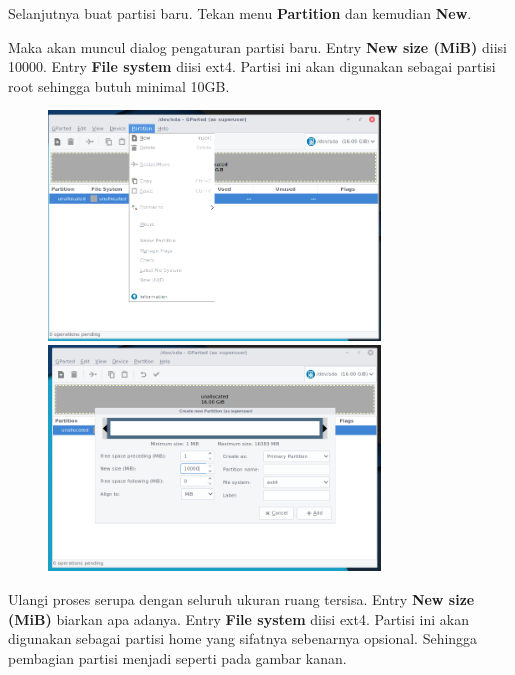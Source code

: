 \documentclass[12pt,]{article}
\begin{document}
	Selanjutnya buat partisi baru. Tekan menu \textbf{Partition} dan kemudian \textbf{New}.
	
	Maka akan muncul dialog pengaturan partisi baru.
	Entry \textbf{New size (MiB)} diisi 10000.
	Entry \textbf{File system}  diisi ext4.
	Partisi ini akan digunakan sebagai partisi root sehingga butuh minimal 10GB.
	
	\newpage
	\begin{figure}[h]
		\centering
		\includegraphics[width=250pt]{installhdd/step_8}
		\includegraphics[width=250pt]{installhdd/step_9}
	\end{figure}

	Ulangi proses serupa dengan seluruh ukuran ruang tersisa.
	Entry \textbf{New size (MiB)} biarkan apa adanya.
	Entry \textbf{File system}  diisi ext4.
	Partisi ini akan digunakan sebagai partisi home yang sifatnya sebenarnya opsional.
	Sehingga pembagian partisi menjadi seperti pada gambar kanan.
	
\end{document}
